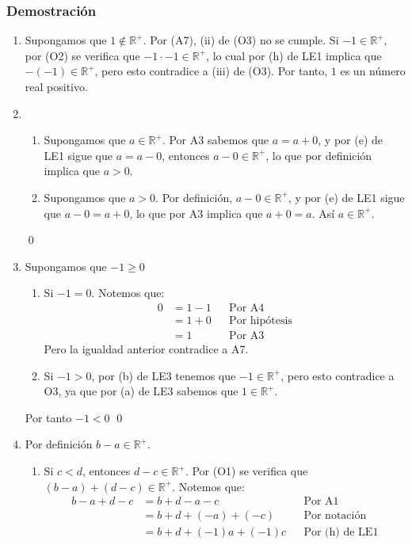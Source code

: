 \documentclass[11pt]{article}
\newcommand{\R}{\mathbb{R}}
\begin{document}
\subsubsection*{Demostración}
%
\begin{enumerate}[label=\alph*)]
\item Supongamos que $1 \notin \R^+$. Por (A7), (ii) de (O3) no se cumple. Si $-1 \in \R^+$, por (O2) se verifica que $-1 \cdot -1 \in \R^+$, lo cual por (h) de LE1 implica que $-(-1) \in \R^+$, pero esto contradice a (iii) de (O3). Por tanto, $1$ es un número real positivo.
\item \begin{enumerate}[label=\roman*)]
    \item Supongamos que $a \in \R^+$. Por A3 sabemos que $a=a+0$, y por (e) de LE1 sigue que $a=a-0$, entonces $a-0 \in \R^+$, lo que por definición implica que $a>0$.
    \item Supongamos que $a>0$. Por definición, $a-0 \in \R^+$, y por (e) de LE1 sigue que $a-0=a+0$, lo que por A3 implica que $a+0=a$. Así $a \in \R^+$.
\end{enumerate}\qed
\pagebreak
\item Supongamos que $-1 \geq 0$
    \begin{enumerate}[label=\roman*)]
    \item Si $-1=0$. Notemos que:
        \begin{align*}
        0 &= 1 - 1 && \text{Por A4}\\
        &= 1 + 0 && \text{Por hipótesis}\\
        &= 1 && \text{Por A3}
        \end{align*}
    Pero la igualdad anterior contradice a A7.
    \item Si $-1 > 0$, por (b) de LE3 tenemos que $-1 \in \R^+$, pero esto contradice a O3, ya que por (a) de LE3 sabemos que $1 \in \R^+$.
    \end{enumerate} Por tanto $-1<0$ \qed
\item Por definición $b-a \in \R^+$.
    \begin{enumerate}[label=\roman*)]
    \item Si $c<d$, entonces $d-c \in \R^+$. Por (O1) se verifica que $(b-a)+(d-c) \in \R^+$. Notemos que:
        \begin{align*}
        b-a+d-c &= b+d-a-c && \text{Por A1}\\
        &= b+d+(-a)+(-c) && \text{Por notación}\\
        &= b+d+(-1)a+(-1)c && \text{Por (h) de LE1}\\

\end{align*}
\end{enumerate}
\end{enumerate}
\end{document}
